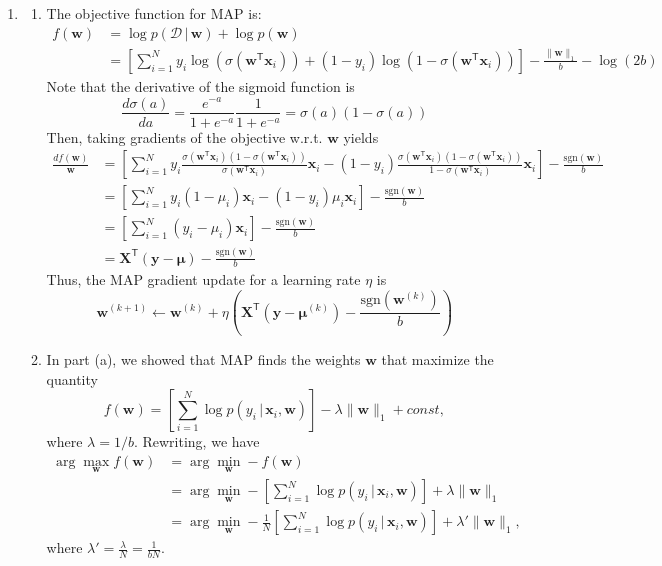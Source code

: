 \documentclass[submit]{harvardml}
\newcommand{\given}{\,|\,}
\newcommand{\trans}{\mathsf{T}}
\newcommand{\bx}{\mathbf{x}}
\newcommand{\bw}{\mathbf{w}}
\begin{document}
\newpage

\begin{enumerate}[label=(\alph*)]
	\item 
	\begin{enumerate}[label=(\roman*)]
		\item The objective function for MAP is:
		\begin{align*}
		f(\bw)
		&= \log p(\mathcal{D}\given\bw) + \log p(\bw) \\
		&= \left[\sum_{i=1}^N
		y_i\log(\sigma(\bw^\trans\bx_i)) + (1 - y_i)\log(1 - \sigma(\bw^\trans\bx_i))
		\right] - \frac{\|\mathbf{w}\|_1}{b} - \log(2b)
		\end{align*}
		Note that the derivative of the sigmoid function is
		\[
		\frac{d\sigma(a)}{da} 
		= \frac{e^{-a}}{1 + e^{-a}}\frac{1}{1 + e^{-a}} 
		= \sigma(a)(1 - \sigma(a))
		\]
		Then, taking gradients of the objective w.r.t. $\bw$ yields
		\begin{align*}
		\frac{df(\bw)}{\bw} &= \left[\sum_{i=1}^N
		y_i\frac{\sigma(\bw^\trans\bx_i)(1 - \sigma(\bw^\trans\bx_i))}{\sigma(\bw^\trans\bx_i)} \bx_i 
		- (1 - y_i)\frac{\sigma(\bw^\trans\bx_i)(1 - \sigma(\bw^\trans\bx_i))}{1 - \sigma(\bw^\trans\bx_i)}\bx_i
		\right] - \frac{\text{sgn}(\bw)}{b} \\
		&= \left[\sum_{i=1}^N
		y_i(1 - \mu_i) \bx_i 
		- (1 - y_i)\mu_i\bx_i
		\right] - \frac{\text{sgn}(\bw)}{b} \\
		&= \left[\sum_{i=1}^N
		(y_i - \mu_i) \bx_i 
		\right] - \frac{\text{sgn}(\bw)}{b} \\
		&= \bm{X}^\trans (\bm{y} - \bm{\mu}) - \frac{\text{sgn}(\bw)}{b}
		\end{align*}
		Thus, the MAP gradient update for a learning rate $\eta$ is
		\[
		\bw^{(k+1)} \gets \bw^{(k)} + \eta \left(\bm{X}^\trans (\bm{y} - \bm{\mu}^{(k)}) - \frac{\text{sgn}(\bw^{(k)})}{b}\right)
		\]
		
		\item In part (a), we showed that MAP finds the weights $\bw$ that maximize the quantity
		\[
		f(\bw) 
		= \left[\sum_{i=1}^N
		\log p(y_i\given \bx_i, \bw)
		\right] - \lambda\|\mathbf{w}\|_1 + const,
		\]
		where $\lambda = 1/b$. Rewriting, we have
		\begin{align*}
		\arg\max_{\bw} f(\bw) 
		&= \arg\min_{\bw} -f(\bw) \\
		&= \arg\min_{\bw} - \left[\sum_{i=1}^N
		\log p(y_i\given \bx_i, \bw)
		\right] + \lambda\|\mathbf{w}\|_1 \\
		&= \arg\min_{\bw} -\frac{1}{N} \left[\sum_{i=1}^N
		\log p(y_i\given \bx_i, \bw)
		\right] + \lambda'\|\mathbf{w}\|_1,
		\end{align*}
		where $\lambda' = \frac{\lambda}{N} = \frac{1}{bN}$.
	\end{enumerate}


\end{enumerate}
\end{document}

